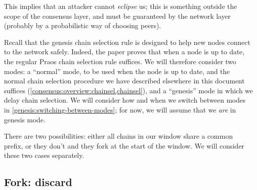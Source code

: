This implies that an attacker cannot \emph{eclipse} us; this is something
outside the scope of the consensus layer, and must be guaranteed by the network
layer (probably by a probabilistic way of choosing peers).

Recall that the genesis chain selection rule is designed to help new nodes
connect to the network safely. Indeed, the paper proves \cite[Theorem
2]{cryptoeprint:2018:378} that when a node is up to date, the regular Praos
chain selection rule suffices. We will therefore consider two modes: a
``normal'' mode, to be used when the node is up to date, and the normal
chain selection procedure we have described elsewhere in this document suffices
(\cref{consensus:overview:chainsel,chainsel}), and a ``genesis'' mode in which
we delay chain selection. We will consider how and when we switch between modes
in \cref{genesis:switching-between-modes}; for now, we will assume that we
\emph{are} in genesis mode.

There are two possibilities: either all chains in our window share a common
prefix, or they don't and they fork at the start of the window. We will consider
these two cases separately.

\subsection{Fork: discard}
\label{genesis:discard}

